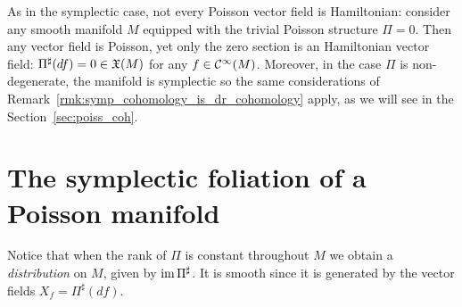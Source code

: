 \documentclass[main.tex]{subfiles}
\begin{document}
\begin{remark}
	As in the symplectic case, not every Poisson vector field is Hamiltonian: consider any smooth manifold $M$ equipped with the trivial Poisson structure $\Pi=0$. Then any vector field is Poisson, yet only the zero section is an Hamiltonian vector field: $\Pi^\sharp(df) = 0 \in \mathfrak{X}(M)$ for any $f \in \mathcal{C}^\infty(M)$. Moreover, in the case $\Pi$ is non-degenerate, the manifold is symplectic so the same considerations of Remark~\ref{rmk:symp_cohomology_is_dr_cohomology} apply, as we will see in the Section~\ref{sec:poiss_coh}.
\end{remark}

\section{The symplectic foliation of a Poisson manifold}
Notice that when the rank of $\Pi$ is constant throughout $M$ we obtain a \emph{distribution} on $M$, given by $\operatorname{im} \Pi^\sharp$. It is smooth since it is generated by the vector fields $X_f = \Pi^\sharp (df)$.
\end{document}
